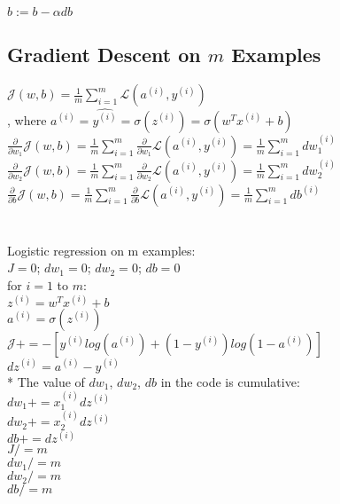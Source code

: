 \documentclass{article}
\begin{document}
$b := b - \alpha db $\\


\newpage
\subsection{Gradient Descent on $m$ Examples}

$\mathcal{J}(w,b) = \frac{1}{m}\sum_{i=1}^{m}\mathcal{L}(a^{(i)},y^{(i)})$\\

, where $a^{(i)} = \hat{y^{(i)}} = \sigma(z^{(i)}) = \sigma{(w^T x^{(i)} + b)}$\\

$\frac{\partial}{\partial w_1} \mathcal{J}(w,b) =\frac{1}{m}\sum_{i=1}^{m} \frac{\partial}{\partial w_1}\mathcal{L}(a^{(i)},y^{(i)})= \frac{1}{m}\sum_{i=1}^{m} dw_1^{(i)}$ \\

$\frac{\partial}{\partial w_2} \mathcal{J}(w,b) =\frac{1}{m}\sum_{i=1}^{m} \frac{\partial}{\partial w_2}\mathcal{L}(a^{(i)},y^{(i)})= \frac{1}{m}\sum_{i=1}^{m} dw_2^{(i)}$ \\

$\frac{\partial}{\partial b} \mathcal{J}(w,b) =\frac{1}{m}\sum_{i=1}^{m} \frac{\partial}{\partial b}\mathcal{L}(a^{(i)},y^{(i)})= \frac{1}{m}\sum_{i=1}^{m} db^{(i)}$ \\\\\\


Logistic regression on m examples:\\

$J=0$; $dw_1 = 0$; $dw_2 = 0$; $db=0$\\

for $i=1$ to $m$:\\
$z^{(i)} = w^T x^{(i)} + b$\\
$a^{(i)} = \sigma(z^{(i)})$\\
$\mathcal{J} += -[y^{(i)} log(a^{(i)}) + (1-y^{(i)})log(1-a^{(i)})]$\\
$dz^{(i)} = a^{(i)}- y^{(i)}$\\
* The value of $dw_1$, $dw_2$, $db$ in the code is cumulative:\\
$dw_1 += x_1^{(i)}dz^{(i)}$\\
$dw_2 += x_2^{(i)}dz^{(i)}$\\
$db += dz^{(i)}$\\


$J/=m$\\
$dw_1 /=m$\\
$dw_2 /=m$\\
$db /=m$\\
\end{document}
